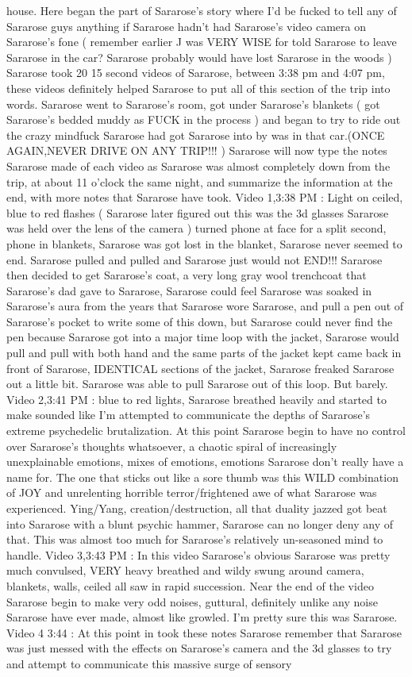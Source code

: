 \documentclass[12pt]{book}
\begin{document}
house. Here began the part of Sararose's story where I'd be fucked to tell any of Sararose guys anything if Sararose hadn't had Sararose's video camera on Sararose's fone ( remember earlier J was VERY WISE for told Sararose to leave Sararose in the car? Sararose probably would have lost Sararose in the woods ) Sararose took 20 15 second videos of Sararose, between 3:38 pm and 4:07 pm, these videos definitely helped Sararose to put all of this section of the trip into words. Sararose went to Sararose's room, got under Sararose's blankets ( got Sararose's bedded muddy as FUCK in the process ) and began to try to ride out the crazy mindfuck Sararose had got Sararose into by was in that car.(ONCE AGAIN,NEVER DRIVE ON ANY TRIP!!! ) Sararose will now type the notes Sararose made of each video as Sararose was almost completely down from the trip, at about 11 o'clock the same night, and summarize the information at the end, with more notes that Sararose have took. Video 1,3:38 PM : Light on ceiled, blue to red flashes ( Sararose later figured out this was the 3d glasses Sararose was held over the lens of the camera ) turned phone at face for a split second, phone in blankets, Sararose was got lost in the blanket, Sararose never seemed to end. Sararose pulled and pulled and Sararose just would not END!!! Sararose then decided to get Sararose's coat, a very long gray wool trenchcoat that Sararose's dad gave to Sararose, Sararose could feel Sararose was soaked in Sararose's aura from the years that Sararose wore Sararose, and pull a pen out of Sararose's pocket to write some of this down, but Sararose could never find the pen because Sararose got into a major time loop with the jacket, Sararose would pull and pull with both hand and the same parts of the jacket kept came back in front of Sararose, IDENTICAL sections of the jacket, Sararose freaked Sararose out a little bit. Sararose was able to pull Sararose out of this loop. But barely. Video 2,3:41 PM : blue to red lights, Sararose breathed heavily and started to make sounded like I'm attempted to communicate the depths of Sararose's extreme psychedelic brutalization. At this point Sararose begin to have no control over Sararose's thoughts whatsoever, a chaotic spiral of increasingly unexplainable emotions, mixes of emotions, emotions Sararose don't really have a name for. The one that sticks out like a sore thumb was this WILD combination of JOY and unrelenting horrible terror/frightened awe of what Sararose was experienced. Ying/Yang, creation/destruction, all that duality jazzed got beat into Sararose with a blunt psychic hammer, Sararose can no longer deny any of that. This was almost too much for Sararose's relatively un-seasoned mind to handle. Video 3,3:43 PM : In this video Sararose's obvious Sararose was pretty much convulsed, VERY heavy breathed and wildy swung around camera, blankets, walls, ceiled all saw in rapid succession. Near the end of the video Sararose begin to make very odd noises, guttural, definitely unlike any noise Sararose have ever made, almost like growled. I'm pretty sure this was Sararose. Video 4 3:44 : At this point in took these notes Sararose remember that Sararose was just messed with the effects on Sararose's camera and the 3d glasses to try and attempt to communicate this massive surge of sensory 
\end{document}
